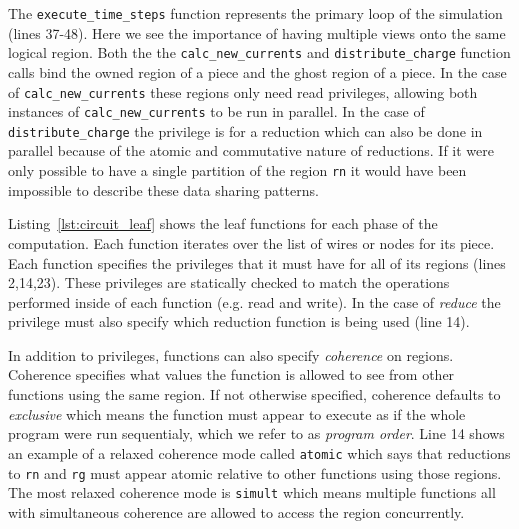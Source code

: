 The {\tt execute\_time\_steps} function represents the primary loop of the simulation (lines 37-48).  Here
we see the importance of having multiple views onto the same logical region.  Both the the 
{\tt calc\_new\_currents} and {\tt distribute\_charge} function calls bind the owned region of a piece 
and the ghost region of a piece.  In the case of {\tt calc\_new\_currents} these regions only need
read privileges, allowing both instances of {\tt calc\_new\_currents} to be run in parallel.  In the
case of {\tt distribute\_charge} the privilege is for a reduction which can also be done 
in parallel because of the atomic and commutative nature of reductions.  If it were only possible to have a single
partition of the region {\tt rn} it would have been impossible to describe these data sharing patterns.

Listing~\ref{lst:circuit_leaf} shows the leaf functions for each phase of the computation.  Each
function iterates over the list of wires or nodes for its piece.  Each function specifies the privileges
that it must have for all of its regions (lines 2,14,23).  These privileges are statically checked
to match the operations performed inside of each function (e.g. read and write).  In the case of {\em reduce}
the privilege must also specify which reduction function is being used (line 14).  

In addition to privileges, functions can also specify {\em coherence} on regions.  Coherence specifies what 
values the function is allowed to see from other functions using the same region.  If not otherwise specified,
coherence defaults to {\em exclusive} which means the function must appear to execute as if the whole program
were run sequentialy, which we refer to as {\em program order}.  Line 14 shows an example of a relaxed
coherence mode called {\tt atomic} which says that reductions to {\tt rn} and {\tt rg} must appear atomic relative to other
functions using those regions.  The most relaxed coherence mode is {\tt simult} which means multiple functions
all with simultaneous coherence are allowed to access the region concurrently.


